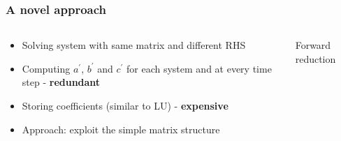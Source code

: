 \begin{frame}
\frametitle{A novel approach}
\begin{columns}
\begin{column}{0.5\textwidth}
\begin{itemize}
\item Solving system with same matrix and different RHS
\item Computing $a^\prime$, $b^\prime$ and $c^\prime$
    for each system and at every time step - \textbf{redundant}
\item Storing coefficients (similar to LU) - \textbf{expensive}
\item Approach: exploit the simple matrix structure
\end{itemize}
\end{column}
\begin{column}{0.5\textwidth}
\centering
Forward reduction
\end{column}
\end{columns}
\end{frame}

